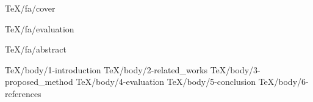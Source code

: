 \documentclass [
	a4paper, %
	12pt, %
	oneside %
] {report} %
\begin{document}
	
	 {TeX/fa/cover}
	
	
	 {TeX/fa/evaluation}
	
	
	
	 {TeX/fa/abstract}

	

	
	 {TeX/body/1-introduction}
	 {TeX/body/2-related_works}
	 {TeX/body/3-proposed_method}
	 {TeX/body/4-evaluation}
	 {TeX/body/5-conclusion}
	 {TeX/body/6-references}
	
		
\end{document}
